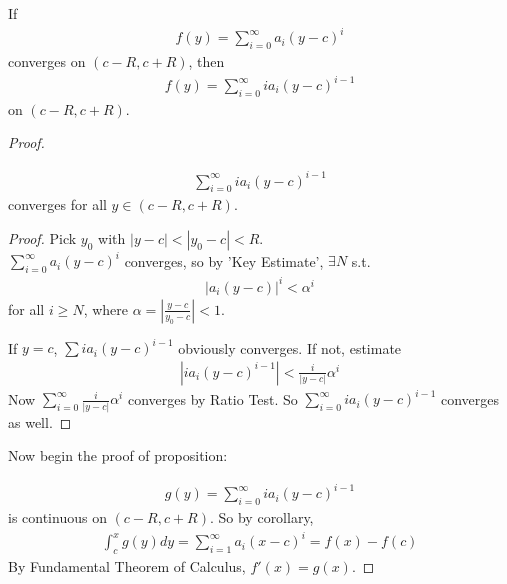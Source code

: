 \documentclass[a4paper]{article}
\begin{document}
\begin{prop}
If
\begin{equation*}
\begin{aligned}
f\left(y\right) = \sum_{i=0}^\infty a_i\left(y-c\right)^i
\end{aligned}
\end{equation*}
converges on $\left(c-R,c+R\right)$, then
\begin{equation*}
\begin{aligned}
f\left(y\right) = \sum_{i=0}^\infty ia_i \left(y-c\right)^{i-1}
\end{aligned}
\end{equation*}
on $\left(c-R,c+R\right)$.
\begin{proof}
\begin{lemma}
\begin{equation*}
\begin{aligned}
\sum_{i=0}^\infty ia_i \left(y-c\right)^{i-1}
\end{aligned}
\end{equation*}
converges for all $y \in \left(c-R,c+R\right)$.

\begin{proof}
Pick $y_0$ with $|y-c| < |y_0-c| < R$.\\
$\sum_{i=0}^\infty a_i \left(y-c\right)^i$ converges, so by 'Key Estimate', $\exists N$ s.t.
\begin{equation*}
\begin{aligned}
|a_i\left(y-c\right)|^i < \alpha^i
\end{aligned}
\end{equation*}
for all $i\geq N$, where $\alpha = \left|\frac{y-c}{y_0-c}\right|<1$.

If $y=c$, $\sum ia_i\left(y-c\right)^{i-1}$ obviously converges. If not, estimate
\begin{equation*}
\begin{aligned}
\left|ia_i\left(y-c\right)^{i-1}\right| < \frac{i}{|y-c|}\alpha^i
\end{aligned}
\end{equation*}
Now $\sum_{i=0}^\infty \frac{i}{|y-c|}\alpha^i$ converges by Ratio Test. So $\sum_{i=0}^\infty ia_i \left(y-c\right)^{i-1}$ converges as well.
\end{proof}
\end{lemma}

Now begin the proof of proposition:

\begin{equation*}
\begin{aligned}
g\left(y\right) = \sum_{i=0}^\infty ia_i \left(y-c\right)^{i-1}
\end{aligned}
\end{equation*}
is continuous on $\left(c-R,c+R\right)$. So by corollary,
\begin{equation*}
\begin{aligned}
\int_c^x g\left(y\right) dy = \sum_{i=1}^\infty a_i \left(x-c\right)^i = f\left(x\right) - f\left(c\right)
\end{aligned}
\end{equation*}
By Fundamental Theorem of Calculus, $f'\left(x\right) = g\left(x\right)$.
\end{proof}
\end{prop}
\end{document}
